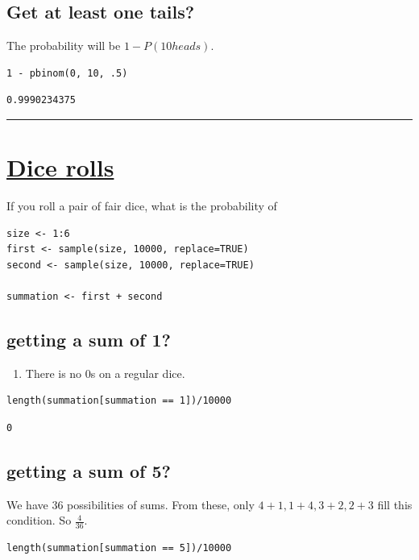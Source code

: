 \documentclass[11pt]{article}
\begin{document}
\subsection{Get at least one tails?}
\label{sec:org390a75d}
The probability will be \(1 - P(10 heads)\).

\begin{verbatim}
1 - pbinom(0, 10, .5)
\end{verbatim}

\begin{verbatim}
0.9990234375
\end{verbatim}


\noindent\rule{\textwidth}{0.5pt}
\section{\underline{Dice rolls}}
\label{sec:org793ed78}
If you roll a pair of fair dice, what is the probability of

\begin{verbatim}
size <- 1:6
first <- sample(size, 10000, replace=TRUE)
second <- sample(size, 10000, replace=TRUE)

summation <- first + second
\end{verbatim}

\subsection{getting a sum of 1?}
\label{sec:orge760101}
\begin{enumerate}
\item There is no 0s on a regular dice.
\end{enumerate}

\begin{verbatim}
length(summation[summation == 1])/10000
\end{verbatim}

\begin{verbatim}
0
\end{verbatim}

\subsection{getting a sum of 5?}
\label{sec:org8efb85a}
We have 36 possibilities of sums. From these, only \(4+1, 1+4, 3+2, 2+3\) fill this condition. So \(\frac{4}{36}\).

\begin{verbatim}
length(summation[summation == 5])/10000
\end{verbatim}
\end{document}
